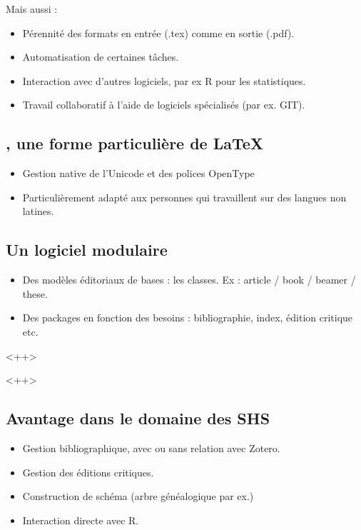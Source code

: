 \begin{slide}
  Mais aussi :
  \begin{itemize}
      \item Pérennité des formats en entrée (.tex) comme en sortie (.pdf).
      \item Automatisation de certaines tâches.
      \item Interaction avec d'autres logiciels, par ex R pour les statistiques.
      \item Travail collaboratif à l'aide de logiciels spécialisés (par ex. GIT).
  \end{itemize}
\end{slide}

\subsection{\XeLaTeX, une forme particulière de \LaTeX}
\begin{slide}
  \begin{itemize}
    \item Gestion native de l'Unicode et des polices OpenType
    \item Particulièrement adapté aux personnes qui travaillent sur des langues non latines.
  \end{itemize}
\end{slide}

\subsection{Un logiciel modulaire}

\begin{slide}
  \begin{itemize}
    \item Des modèles éditoriaux de bases : les classes. Ex : article / book / beamer / these.
    \item Des packages en fonction des besoins : bibliographie, index, édition critique etc. 
  \end{itemize}<++>
\end{slide}<++>
\subsection{Avantage dans le domaine des SHS}

\begin{slide}
  \begin{itemize}
    \item Gestion bibliographique, avec ou sans relation avec Zotero. 
    \item Gestion des éditions critiques.
    \item Construction de schéma (arbre généalogique par ex.)
    \item Interaction directe avec R.
  \end{itemize}
\end{slide}


